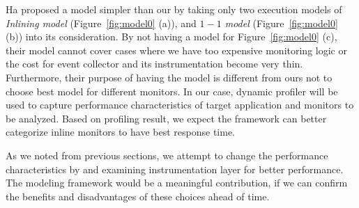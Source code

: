 Ha\etal\cite{cab:oopsala2009} proposed a model simpler than our by taking only
two execution models of {\it Inlining model} (Figure~\ref{fig:model0} (a)), and
{\it $1-1$ model} (Figure~\ref{fig:model0} (b)) into its consideration. By not
having a model for Figure~\ref{fig:model0} (c), their model cannot cover cases
where we have too expensive monitoring logic or the cost for event collector
and its instrumentation become very thin. Furthermore, their purpose of having
the model is different from ours not to choose best model for different
monitors.  In our case, dynamic profiler will be used to capture performance
characteristics of target application and monitors to be analyzed. Based on
profiling result, we expect the framework can better categorize inline monitors 
to have best response time.

As we noted from previous sections, we attempt to change the performance
characteristics by \sreplica and examining instrumentation layer for better
performance. The modeling framework would be a meaningful contribution, if we
can confirm the benefits and disadvantages of these choices ahead of time.
 



